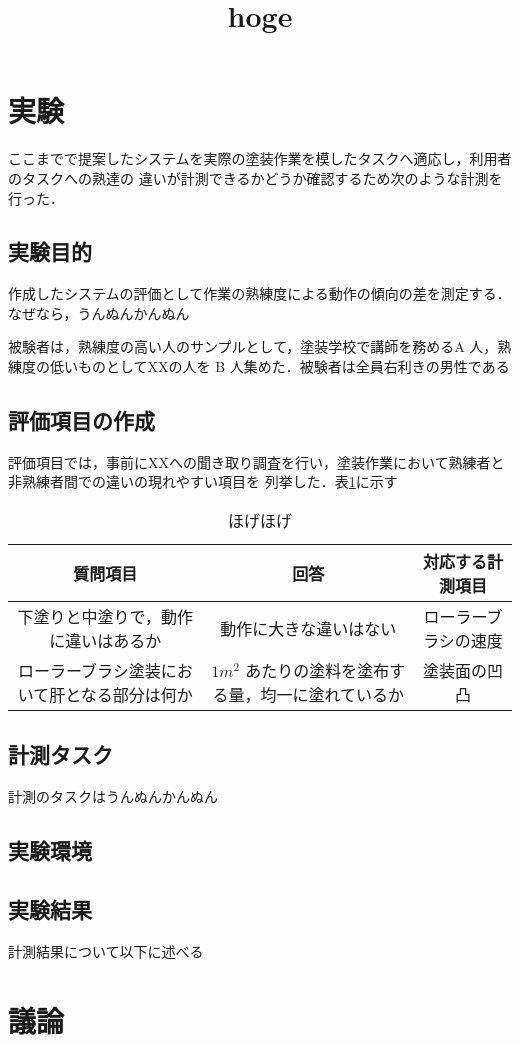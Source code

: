 \documentclass[a4j]{jarticle}
\title{hoge}
\begin{document}
\section{実験}
ここまでで提案したシステムを実際の塗装作業を模したタスクへ適応し，利用者のタスクへの熟達の
違いが計測できるかどうか確認するため次のような計測を行った．
\subsection{実験目的}
作成したシステムの評価として作業の熟練度による動作の傾向の差を測定する．
なぜなら，うんぬんかんぬん

被験者は，熟練度の高い人のサンプルとして，塗装学校で講師を務めるA 人，熟練度の低いものとしてXXの人を
B 人集めた．被験者は全員右利きの男性である
\subsection{評価項目の作成}
評価項目では，事前にXXへの聞き取り調査を行い，塗装作業において熟練者と非熟練者間での違いの現れやすい項目を
列挙した．表\ref{table:1}に示す
\begin{table}[t]
    \caption{ほげほげ}
    \label{table:1}
    \begin{tabular}{ccc}
        質問項目                                     & 回答                                                 & 対応する計測項目     \\
        \hline\hline
        下塗りと中塗りで，動作に違いはあるか         & 動作に大きな違いはない                               & ローラーブラシの速度 \\
        ローラーブラシ塗装において肝となる部分は何か & $1 m^2$ あたりの塗料を塗布する量，均一に塗れているか & 塗装面の凹凸
    \end{tabular}
\end{table}
\subsection{計測タスク}
計測のタスクはうんぬんかんぬん
\subsection{実験環境}
\subsection{実験結果}
計測結果について以下に述べる

\section{議論}
\end{document}

